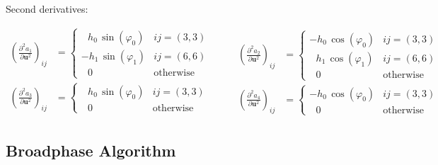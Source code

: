 Second derivatives:

\begin{equation*}
\begin{aligned}
\left(\frac{\partial^2 a_1}{\partial \boldsymbol{u}^2}\right)_{ij} &=
\begin{cases}
\:\:\:h_0\,\sin(\varphi_0) & \text{$ij = (3,3)$}\\
-h_1\,\sin(\varphi_1) & \text{$ij = (6,6)$}\\
\:\:\:0 & \text{otherwise}
\end{cases}\\
\left(\frac{\partial^2 a_3}{\partial \boldsymbol{u}^2}\right)_{ij} &=
\begin{cases}
\:\:\:h_0\,\sin(\varphi_0) & \text{$ij = (3,3)$}\\
\:\:\:0 & \text{otherwise}
\end{cases}\\
\end{aligned}
\qquad
\begin{aligned}
\left(\frac{\partial^2 a_2}{\partial \boldsymbol{u}^2}\right)_{ij} &=
\begin{cases}
-h_0\,\cos(\varphi_0) & \text{$ij = (3,3)$}\\
\:\:\:h_1\,\cos(\varphi_1) & \text{$ij = (6,6)$}\\
\:\:\:0 & \text{otherwise}
\end{cases}\\
\left(\frac{\partial^2 a_4}{\partial \boldsymbol{u}^2}\right)_{ij} &=
\begin{cases}
-h_0\,\cos(\varphi_0) & \text{$ij = (3,3)$}\\
\:\:\:0 & \text{otherwise}
\end{cases}
\end{aligned}
\end{equation*}


\subsection{Broadphase Algorithm}
